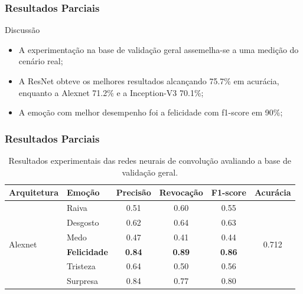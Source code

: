 \documentclass{beamer}
\begin{document}
\begin{frame}
\frametitle{Resultados Parciais}
 \begin{block}{Discussão}
\begin{itemize}
\item A experimentação na base de validação geral assemelha-se a uma medição do cenário real;
\item A ResNet obteve os melhores resultados alcançando 75.7\% em acurácia, enquanto a Alexnet 71.2\% e a Inception-V3 70.1\%;
\pause
\item A emoção com melhor desempenho foi a felicidade com f1-score em 90\%;
\end{itemize}
\end{block}
\end{frame}


\begin{frame}
 \frametitle{Resultados Parciais}
\begin{table}[]
\tiny
\centering
\caption{Resultados experimentais das redes neurais de convolução avaliando a base de validação geral.}
\label{table:resultsexp}
\begin{tabular}{llcccc}
\hline
\textbf{Arquitetura}                & \textbf{Emoção}       & \textbf{Precisão} & \textbf{Revocação} & \textbf{F1-score} & \textbf{Acurácia}               \\ \hline
\multirow{8}{*}{Alexnet}            & Raiva                 & 0.51              & 0.60               & 0.55              & \multirow{8}{*}{0.712}          \\
                                    & Desgosto              & 0.62              & 0.64               & 0.63              &                                 \\
                                    & Medo                  & 0.47              & 0.41               & 0.44              &                                 \\
                                    & \scriptsize \textbf{Felicidade}            & \scriptsize \textbf{0.84}              & \scriptsize \textbf{0.89}               & \scriptsize \textbf{0.86}              &                                 \\
                                    & Tristeza              & 0.64              & 0.50               & 0.56              &                                 \\
                                    & Surpresa              & 0.84              & 0.77               & 0.80              &                                 \\

\end{tabular}
\end{table}
\end{frame}
\end{document}

